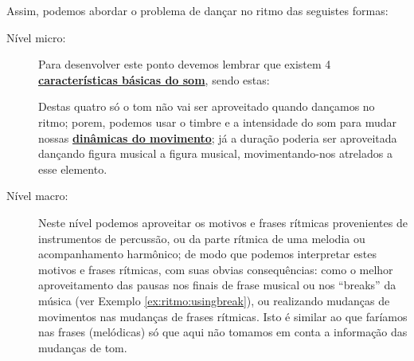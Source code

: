 Assim, podemos abordar o problema de dançar no ritmo das seguistes formas:
\begin{description}
\item [Nível micro:] Para desenvolver este ponto devemos lembrar 
que existem 4 \hyperref[sec:carateristasom]{\textbf{características básicas do som}},
sendo estas: 
Destas quatro só o tom não vai ser aproveitado quando dançamos no ritmo;
porem, podemos usar o timbre e a intensidade do som para mudar nossas 
\hyperref[sec:musicalidade:dinamicas]{\textbf{dinâmicas do movimento}};
já a duração poderia ser aproveitada dançando figura musical a figura musical,
movimentando-nos atrelados a esse elemento. 


\item [Nível macro:] Neste nível podemos aproveitar os  motivos e frases rítmicas
provenientes de instrumentos de percussão, ou da parte rítmica de uma melodia ou acompanhamento harmônico;
de modo que podemos interpretar estes motivos e frases rítmicas, 
com suas obvias consequências: como o melhor aproveitamento das pausas
 nos finais de frase musical ou nos ``breaks'' da música (ver Exemplo \ref{ex:ritmo:usingbreak}),
ou realizando mudanças de movimentos nas mudanças de frases rítmicas.
Isto é similar ao que faríamos nas frases (melódicas) só que aqui 
não tomamos em conta a informação das mudanças de tom.
\end{description}


